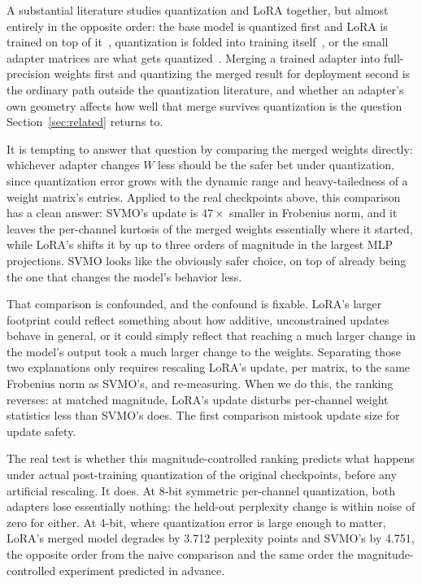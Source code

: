 \documentclass[conference]{IEEEtran}
\begin{document}
A substantial literature studies quantization and LoRA together, but almost entirely in the opposite order: the base model is quantized first and LoRA is trained on top of it~\cite{dettmers2023qlora}, quantization is folded into training itself~\cite{l4q}, or the small adapter matrices are what gets quantized~\cite{lowra}. Merging a trained adapter into full-precision weights first and quantizing the merged result for deployment second is the ordinary path outside the quantization literature, and whether an adapter's own geometry affects how well that merge survives quantization is the question Section~\ref{sec:related} returns to.

It is tempting to answer that question by comparing the merged weights directly: whichever adapter changes $W$ less should be the safer bet under quantization, since quantization error grows with the dynamic range and heavy-tailedness of a weight matrix's entries. Applied to the real checkpoints above, this comparison has a clean answer: SVMO's update is $47\times$ smaller in Frobenius norm, and it leaves the per-channel kurtosis of the merged weights essentially where it started, while LoRA's shifts it by up to three orders of magnitude in the largest MLP projections. SVMO looks like the obviously safer choice, on top of already being the one that changes the model's behavior less.

That comparison is confounded, and the confound is fixable. LoRA's larger footprint could reflect something about how additive, unconstrained updates behave in general, or it could simply reflect that reaching a much larger change in the model's output took a much larger change to the weights. Separating those two explanations only requires rescaling LoRA's update, per matrix, to the same Frobenius norm as SVMO's, and re-measuring. When we do this, the ranking reverses: at matched magnitude, LoRA's update disturbs per-channel weight statistics less than SVMO's does. The first comparison mistook update size for update safety.

The real test is whether this magnitude-controlled ranking predicts what happens under actual post-training quantization of the original checkpoints, before any artificial rescaling. It does. At 8-bit symmetric per-channel quantization, both adapters lose essentially nothing: the held-out perplexity change is within noise of zero for either. At 4-bit, where quantization error is large enough to matter, LoRA's merged model degrades by 3.712 perplexity points and SVMO's by 4.751, the opposite order from the naive comparison and the same order the magnitude-controlled experiment predicted in advance.
\end{document}
